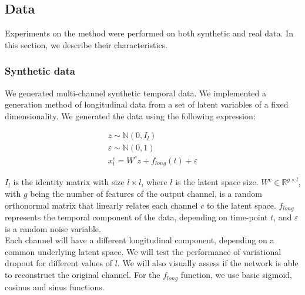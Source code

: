 \subsection{Data}

Experiments on the method were performed on both synthetic and real data. In this section, we describe their characteristics.

\subsubsection{Synthetic data}

We generated multi-channel synthetic temporal data. We implemented a generation method of longitudinal data from a set of latent variables of a fixed dimensionality. We generated the data using the following expression:

\begin{equation} 
\begin{gathered} \label{rnn:eq:synthdata}
   z \sim \mathbb{N}(0, I_{l}) \\
   \varepsilon \sim \mathbb{N}(0, 1) \\
   x^c_t = W^{c}z + f_{long}(t) + \varepsilon
\end{gathered}
\end{equation}

$I_{l}$ is the identity matrix with size $l \times l$, where $l$ is the latent space size. $W^c \in \mathbb{R}^{g \times l}$, with $g$ being the number of features of the output channel, is a random orthonormal matrix that linearly relates each channel $c$ to the latent space.  $f_{long}$ represents the temporal component of the data, depending on time-point $t$, and $\varepsilon$ is a random noise variable. \\

Each channel will have a different longitudinal component, depending on a common underlying latent space. We will test the performance of variational dropout for different values of $l$. We will also visually assess if the network is able to reconstruct the original channel. For the $f_{long}$ function, we use basic sigmoid, cosinus and sinus functions.   \\


